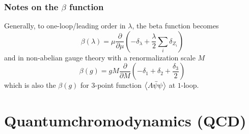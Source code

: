 \subsubsection{Notes on the $\beta$ function}
Generally, to one-loop/leading order in $\lambda$, the beta function becomes
\begin{equation*}
	\beta(\lambda) = \mu \frac{\partial}{\partial \mu} \left(-\delta_{\lambda}+\frac{\lambda}{2} \sum_i \delta_{Z_i}\right)
\end{equation*}
and in non-abelian gauge theory with a renormalization scale $M$
\begin{equation*}
	\beta(g) = g M\frac{\partial}{\partial M} \left(-\delta_1+\delta_2+\frac{\delta_3}{2} \right)
\end{equation*}
which is also the $\beta(g)$ for $3$-point function $\expval{A\bar{\psi}\psi}$ at $1$-loop.
\section{Quantumchromodynamics (QCD)}
